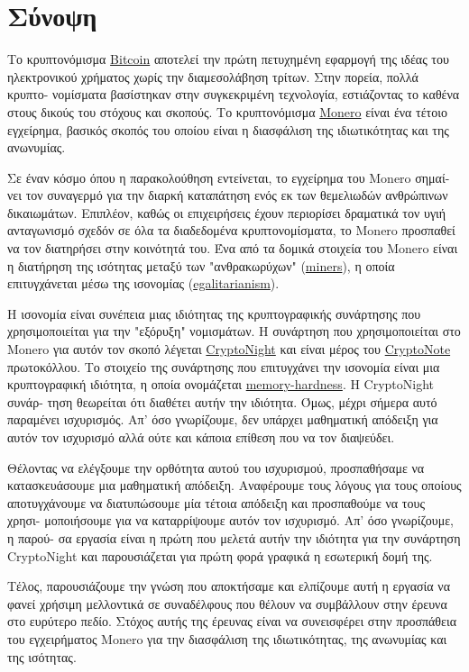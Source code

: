 %
%
\thispagestyle{empty}
\chapter*{Σύνοψη}
Το κρυπτονόμισμα \hyperref[sec:Bitcoin]{Bitcoin} αποτελεί την πρώτη πετυχημένη εφαρμογή της ιδέας του ηλεκτρονικού χρήματος χωρίς την διαμεσολάβηση τρίτων. Στην πορεία, πολλά κρυπτο- νομίσματα βασίστηκαν στην συγκεκριμένη τεχνολογία, εστιάζοντας το καθένα στους δικούς του στόχους και σκοπούς. Το κρυπτονόμισμα \hyperref[sec:Monero]{Monero} είναι ένα τέτοιο εγχείρημα, βασικός σκοπός του οποίου είναι η διασφάλιση της ιδιωτικότητας και της ανωνυμίας.

Σε έναν κόσμο όπου η παρακολούθηση εντείνεται, το εγχείρημα του Monero σημαί- νει τον συναγερμό για την διαρκή καταπάτηση ενός εκ των θεμελιωδών ανθρώπινων δικαιωμάτων. Επιπλέον, καθώς οι επιχειρήσεις έχουν περιορίσει δραματικά τον υγιή ανταγωνισμό σχεδόν σε όλα τα διαδεδομένα κρυπτονομίσματα, το Monero προσπαθεί να τον διατηρήσει στην κοινότητά του. Ένα από τα δομικά στοιχεία του Monero είναι η διατήρηση της ισότητας μεταξύ των "ανθρακωρύχων" (\hyperref[sec:mining]{miners}), η οποία επιτυγχάνεται μέσω της ισονομίας (\hyperref[sec:egalitarian]{egalitarianism}).

Η ισονομία είναι συνέπεια μιας ιδιότητας της κρυπτογραφικής συνάρτησης που χρησιμοποιείται για την "εξόρυξη" νομισμάτων. Η συνάρτηση που χρησιμοποιείται στο Monero για αυτόν τον σκοπό λέγεται \hyperref[ch:cryptonight]{CryptoNight} και είναι μέρος του \hyperref[sec:CryptoNote]{CryptoNote} πρωτοκόλλου. Το στοιχείο της συνάρτησης που επιτυγχάνει την ισονομία είναι μια κρυπτογραφική ιδιότητα, η οποία ονομάζεται \hyperref[sec:memory-hard]{memory-hardness}. Η CryptoNight συνάρ- τηση θεωρείται ότι διαθέτει αυτήν την ιδιότητα. Όμως, μέχρι σήμερα αυτό παραμένει ισχυρισμός. Απ' όσο γνωρίζουμε, δεν υπάρχει μαθηματική απόδειξη για αυτόν τον ισχυρισμό αλλά ούτε και κάποια επίθεση που να τον διαψεύδει.

Θέλοντας να ελέγξουμε την ορθότητα αυτού του ισχυρισμού, προσπαθήσαμε να κατασκευάσουμε μια μαθηματική απόδειξη. Αναφέρουμε τους λόγους για τους οποίους αποτυγχάνουμε να διατυπώσουμε μία τέτοια απόδειξη και προσπαθούμε να τους χρησι- μοποιήσουμε για να καταρρίψουμε αυτόν τον ισχυρισμό. Απ' όσο γνωρίζουμε, η παρού- σα εργασία είναι η πρώτη που μελετά αυτήν την ιδιότητα για την συνάρτηση CryptoNight και παρουσιάζεται για πρώτη φορά γραφικά η εσωτερική δομή της.

Τέλος, παρουσιάζουμε την γνώση που αποκτήσαμε και ελπίζουμε αυτή η εργασία να φανεί χρήσιμη μελλοντικά σε συναδέλφους που θέλουν να συμβάλλουν στην έρευνα στο ευρύτερο πεδίο. Στόχος αυτής της έρευνας είναι να συνεισφέρει στην προσπάθεια του εγχειρήματος Monero για την διασφάλιση της ιδιωτικότητας, της ανωνυμίας και της ισότητας.
\clearpage
%
%
\thispagestyle{empty}
\null
\clearpage
